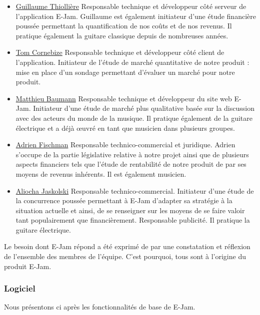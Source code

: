 \documentclass[a4,12pt]{article}
\begin{document}
\begin{itemize}
\item \underline{Guillaume Thiollière}
Responsable technique et développeur côté
serveur de l'application E-Jam. Guillaume est également initiateur
d'une étude financière poussée permettant la quantification de nos
coûts et de nos revenus. Il pratique également la guitare classique
depuis de nombreuses années.

\item \underline{Tom Cornebize}
Responsable technique et développeur côté client
de l'application. Initiateur de l'étude de marché quantitative de notre
produit : mise en place d'un sondage permettant d'évaluer un marché
pour notre produit.

\item \underline{Matthieu Baumann}
Responsable technique et développeur du site
web E-Jam. Initiateur d'une étude de marché plus qualitative basée sur la
discussion avec des acteurs du monde de la musique. Il pratique
également de la guitare électrique et a déjà œuvré en tant que musicien
dans plusieurs groupes.

\item \underline{Adrien Fischman}
Responsable technico-commercial et juridique.
Adrien s'occupe de la partie législative relative à notre projet ainsi que
de plusieurs aspects financiers tels que l'étude de rentabilité de notre
produit de par ses moyens de revenus inhérents. Il est également
musicien.

\item \underline{Aliocha Jaskolski}
Responsable technico-commercial. Initiateur d'une
étude de la concurrence poussée permettant à E-Jam d'adapter sa stratégie
à la situation actuelle et ainsi, de se renseigner sur les moyens de se faire
valoir tant populairement que financièrement. Responsable publicité. Il
pratique la guitare électrique.

\end{itemize}

Le besoin dont E-Jam répond a été exprimé de par une constatation et réflexion de
l'ensemble des membres de l'équipe. C'est pourquoi, tous sont à l'origine du produit E-Jam.


\subsubsection{Logiciel}

Nous présentons ci après les fonctionnalités de base de E-Jam.
\end{document}
